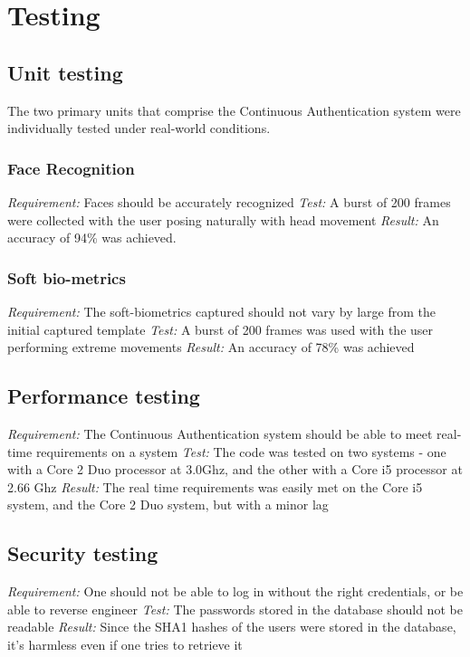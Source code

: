 \documentclass[12pt]{article}			%
\begin{document}
\section{ Testing }

\subsection{ Unit testing }
The two primary units that comprise the Continuous Authentication system were individually tested under real-world conditions.

\subsubsection{ Face Recognition }
\emph{ Requirement: } Faces should be accurately recognized
\emph{ Test: } A burst of 200 frames were collected with the user posing naturally with head movement
\emph{ Result: } An accuracy of 94\% was achieved.

\subsubsection{ Soft bio-metrics }
\emph{ Requirement: } The soft-biometrics captured should not vary by large from the initial captured template
\emph{ Test: } A burst of 200 frames was used with the user performing extreme movements
\emph{ Result: } An accuracy of 78\% was achieved

\subsection{ Performance testing } 
\emph{ Requirement: } The Continuous Authentication system should be able to meet real-time requirements on a system
\emph{ Test: } The code was tested on two systems - one with a Core 2 Duo processor at 3.0Ghz, and the other with a Core i5 processor at 2.66 Ghz
\emph{ Result: } The real time requirements was easily met on the Core i5 system, and the Core 2 Duo system, but with a minor lag

\subsection{ Security testing}
\emph{ Requirement: } One should not be able to log in without the right credentials, or be able to reverse engineer
\emph{ Test: } The passwords stored in the database should not be readable
\emph{ Result: } Since the SHA1 hashes of the users were stored in the database, it's harmless even if one tries to retrieve it
\end{document}
